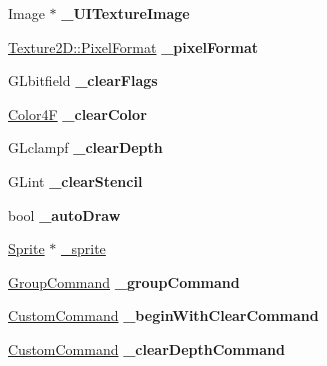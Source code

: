 \begin{DoxyCompactItemize}
Image $\ast$ {\bfseries \+\_\+\+U\+I\+Texture\+Image}
\item 
\mbox{\label{classRenderTexture_a129cbcc132a2e2cf6caeb37d15ed91fc}} 
\hyperlink{classTexture2D_a45d9d8bb5a0669def36bbdfbfb91d220}{Texture2\+D\+::\+Pixel\+Format} {\bfseries \+\_\+pixel\+Format}
\item 
\mbox{\label{classRenderTexture_aa3b4390ac893522cc766120fe0d58c45}} 
G\+Lbitfield {\bfseries \+\_\+clear\+Flags}
\item 
\mbox{\label{classRenderTexture_acfee00b98ea7476a289cbdae067b5c48}} 
\hyperlink{structColor4F}{Color4F} {\bfseries \+\_\+clear\+Color}
\item 
\mbox{\label{classRenderTexture_a79eb519b9a38d8ed63fdfa65a5a21392}} 
G\+Lclampf {\bfseries \+\_\+clear\+Depth}
\item 
\mbox{\label{classRenderTexture_a23477c35b168db963fb0eb5e77562db1}} 
G\+Lint {\bfseries \+\_\+clear\+Stencil}
\item 
\mbox{\label{classRenderTexture_a1622ac5911b86396e04626e1e2d61446}} 
bool {\bfseries \+\_\+auto\+Draw}
\item 
\hyperlink{classSprite}{Sprite} $\ast$ \hyperlink{classRenderTexture_a79cb2034e0a68e453c3c905800f6f440}{\+\_\+sprite}
\item 
\mbox{\label{classRenderTexture_a4c941ab9a159fab91afd61ca78f080ea}} 
\hyperlink{classGroupCommand}{Group\+Command} {\bfseries \+\_\+group\+Command}
\item 
\mbox{\label{classRenderTexture_a630acb3c0a1a959e287093481e21e7b2}} 
\hyperlink{classCustomCommand}{Custom\+Command} {\bfseries \+\_\+begin\+With\+Clear\+Command}
\item 
\mbox{\label{classRenderTexture_a77f9467a8cae16617942c8b6d18b84ef}} 
\hyperlink{classCustomCommand}{Custom\+Command} {\bfseries \+\_\+clear\+Depth\+Command}
\item 
\mbox{\label{classRenderTexture_a70ceef68b08aff90c7f2ec6189456c0c}} 

\end{DoxyCompactItemize}
